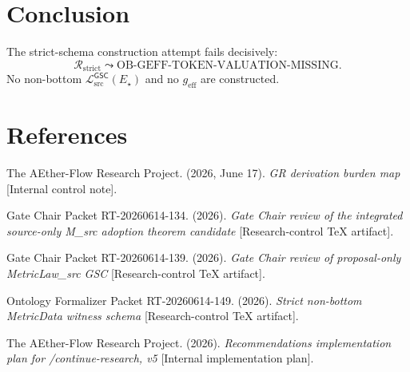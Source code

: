\documentclass[11pt]{article}
\newcommand{\MetricData}{\mathcal{L}_{\mathrm{src}}^{\mathsf{GSC}}}
\newcommand{\geff}{g_{\mathrm{eff}}}
\begin{document}
\section{Conclusion}

The strict-schema construction attempt fails decisively:
\[
  \mathcal{R}_{\mathrm{strict}}
  \leadsto
  \mathrm{OB\mbox{-}GEFF\mbox{-}TOKEN\mbox{-}VALUATION\mbox{-}MISSING}.
\]
No non-bottom \(\MetricData(E_{\star})\) and no \(\geff\) are constructed.

\section*{References}

The AEther-Flow Research Project. (2026, June 17). \emph{GR derivation burden
map} [Internal control note].

Gate Chair Packet RT-20260614-134. (2026). \emph{Gate Chair review of the
integrated source-only M\_src adoption theorem candidate} [Research-control
TeX artifact].

Gate Chair Packet RT-20260614-139. (2026). \emph{Gate Chair review of
proposal-only MetricLaw\_src GSC} [Research-control TeX artifact].

Ontology Formalizer Packet RT-20260614-149. (2026). \emph{Strict non-bottom
MetricData witness schema} [Research-control TeX artifact].

The AEther-Flow Research Project. (2026). \emph{Recommendations implementation
plan for /continue-research, v5} [Internal implementation plan].
\end{document}
